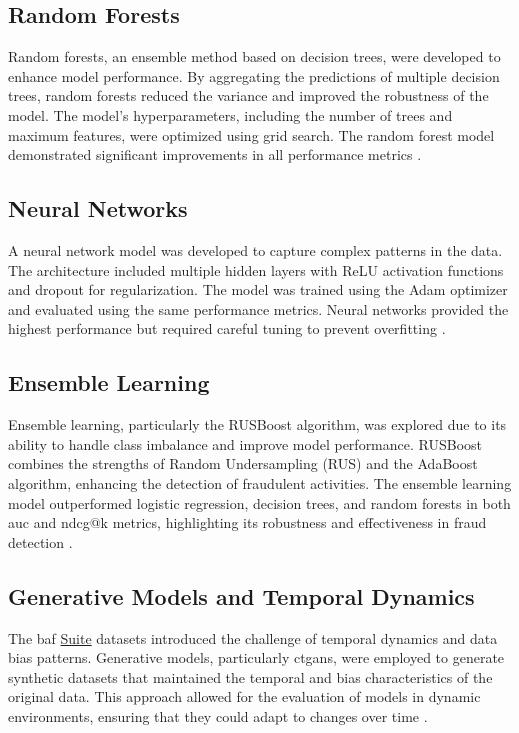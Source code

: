 \documentclass[12pt,a4paper]{report}
\begin{document}
\subsection{Random Forests}
Random forests, an ensemble method based on decision trees, were developed to enhance model performance. By aggregating the predictions of multiple decision trees, random forests reduced the variance and improved the robustness of the model. The model's hyperparameters, including the number of trees and maximum features, were optimized using grid search. The random forest model demonstrated significant improvements in all performance metrics 
\citep{seera2024intelligent}.\\


\subsection{Neural Networks}
A neural network model was developed to capture complex patterns in the data. The architecture included multiple hidden layers with ReLU activation functions and dropout for regularization. The model was trained using the Adam optimizer and evaluated using the same performance metrics. Neural networks provided the highest performance but required careful tuning to prevent overfitting \citep{chawla2002smote}.\\

\subsection{Ensemble Learning}
Ensemble learning, particularly the RUSBoost algorithm, was explored due to its ability to handle class imbalance and improve model performance. RUSBoost combines the strengths of Random Undersampling (RUS) and the AdaBoost algorithm, enhancing the detection of fraudulent activities. The ensemble learning model outperformed logistic regression, decision trees, and random forests in both \acrshort{auc} and \acrshort{ndcg@k} metrics, highlighting its robustness and effectiveness in fraud detection \citep{bao2020detecting}.\\

\subsection{Generative Models and Temporal Dynamics}
The \acrshort{baf} \href{https://www.kaggle.com/datasets/sgpjesus/bank-account-fraud-dataset-neurips-2022/code}{Suite} datasets introduced the challenge of temporal dynamics and data bias patterns. Generative models, particularly \acrshort{ctgan}s, were employed to generate synthetic datasets that maintained the temporal and bias characteristics of the original data. This approach allowed for the evaluation of models in dynamic environments, ensuring that they could adapt to changes over time \citep{jesus2022turning}.\\
\end{document}
